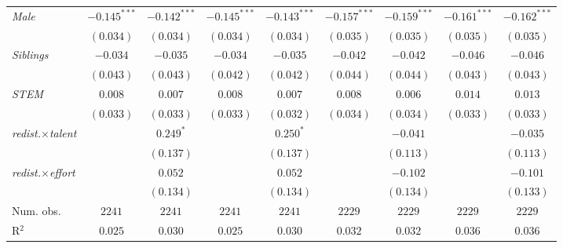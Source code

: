 \begin{table}[htpb]
\begin{center}
\begin{footnotesize}
\begin{threeparttable}
\begin{tabular}{l c c c c c c c c}
\textit{Male}                           & $-0.145^{***}$ & $-0.142^{***}$ & $-0.145^{***}$ & $-0.143^{***}$ & $-0.157^{***}$ & $-0.159^{***}$ & $-0.161^{***}$ & $-0.162^{***}$ \\
                                        & $(0.034)$      & $(0.034)$      & $(0.034)$      & $(0.034)$      & $(0.035)$      & $(0.035)$      & $(0.035)$      & $(0.035)$      \\
\textit{Siblings}                       & $-0.034$       & $-0.035$       & $-0.034$       & $-0.035$       & $-0.042$       & $-0.042$       & $-0.046$       & $-0.046$       \\
                                        & $(0.043)$      & $(0.043)$      & $(0.042)$      & $(0.042)$      & $(0.044)$      & $(0.044)$      & $(0.043)$      & $(0.043)$      \\
\textit{STEM}                           & $0.008$        & $0.007$        & $0.008$        & $0.007$        & $0.008$        & $0.006$        & $0.014$        & $0.013$        \\
                                        & $(0.033)$      & $(0.033)$      & $(0.033)$      & $(0.032)$      & $(0.034)$      & $(0.034)$      & $(0.033)$      & $(0.033)$      \\
\textit{redist.}$\times$\textit{talent} &                & $0.249^{*}$    &                & $0.250^{*}$    &                & $-0.041$       &                & $-0.035$       \\
                                        &                & $(0.137)$      &                & $(0.137)$      &                & $(0.113)$      &                & $(0.113)$      \\
\textit{redist.}$\times$\textit{effort} &                & $0.052$        &                & $0.052$        &                & $-0.102$       &                & $-0.101$       \\
                                        &                & $(0.134)$      &                & $(0.134)$      &                & $(0.134)$      &                & $(0.133)$      \\
\midrule
Num. obs.                               & $2241$         & $2241$         & $2241$         & $2241$         & $2229$         & $2229$         & $2229$         & $2229$         \\
R$^2$                                   & $0.025$        & $0.030$        & $0.025$        & $0.030$        & $0.032$        & $0.032$        & $0.036$        & $0.036$        \\

\end{tabular}
\end{threeparttable}
\end{footnotesize}
\end{center}
\end{table}
